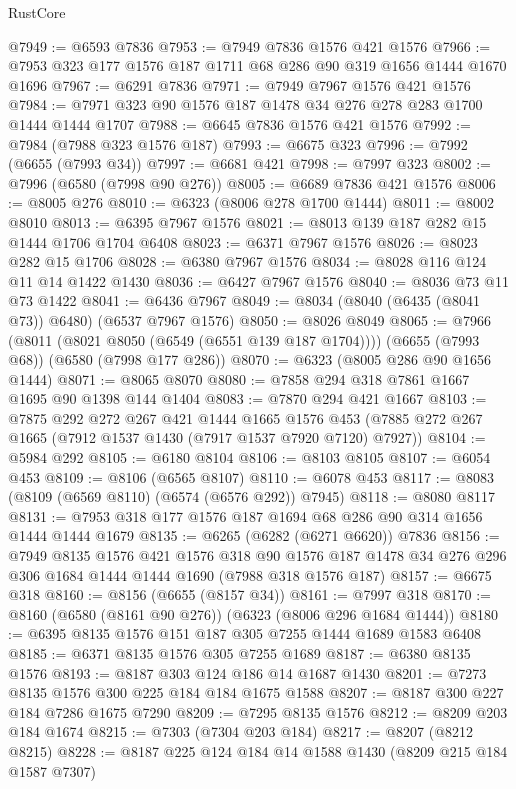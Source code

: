 \begin{lexlean}{RustCore}
\begin{coremodule}
{\begin{coremodule}
{{{{{{{{{{{{{{{{{{{{{{{{{{{{{{{{{{{{{{{{{{{{{@7949 := @6593 @7836
@7953 := @7949 @7836 @1576 @421 @1576
@7966 := @7953 @323 @177 @1576 @187 @1711 @68 @286 @90 @319 @1656 @1444 @1670 @1696
@7967 := @6291 @7836
@7971 := @7949 @7967 @1576 @421 @1576
@7984 := @7971 @323 @90 @1576 @187 @1478 @34 @276 @278 @283 @1700 @1444 @1444 @1707
@7988 := @6645 @7836 @1576 @421 @1576
@7992 := @7984 (@7988 @323 @1576 @187)
@7993 := @6675 @323
@7996 := @7992 (@6655 (@7993 @34))
@7997 := @6681 @421
@7998 := @7997 @323
@8002 := @7996 (@6580 (@7998 @90 @276))
@8005 := @6689 @7836 @421 @1576
@8006 := @8005 @276
@8010 := @6323 (@8006 @278 @1700 @1444)
@8011 := @8002 @8010
@8013 := @6395 @7967 @1576
@8021 := @8013 @139 @187 @282 @15 @1444 @1706 @1704 @6408
@8023 := @6371 @7967 @1576
@8026 := @8023 @282 @15 @1706
@8028 := @6380 @7967 @1576
@8034 := @8028 @116 @124 @11 @14 @1422 @1430
@8036 := @6427 @7967 @1576
@8040 := @8036 @73 @11 @73 @1422
@8041 := @6436 @7967
@8049 := @8034 (@8040 (@6435 (@8041 @73)) @6480) (@6537 @7967 @1576)
@8050 := @8026 @8049
@8065 := @7966
    (@8011 (@8021 @8050 (@6549 (@6551 @139 @187 @1704))))
    (@6655 (@7993 @68))
    (@6580 (@7998 @177 @286))
@8070 := @6323 (@8005 @286 @90 @1656 @1444)
@8071 := @8065 @8070
@8080 := @7858 @294 @318 @7861 @1667 @1695 @90 @1398 @144 @1404
@8083 := @7870 @294 @421 @1667
@8103 := @7875
    @292
    @272
    @267
    @421
    @1444
    @1665
    @1576
    @453
    (@7885 @272 @267 @1665 (@7912 @1537 @1430 (@7917 @1537 @7920 @7120) @7927))
@8104 := @5984 @292
@8105 := @6180 @8104
@8106 := @8103 @8105
@8107 := @6054 @453
@8109 := @8106 (@6565 @8107)
@8110 := @6078 @453
@8117 := @8083 (@8109 (@6569 @8110) (@6574 (@6576 @292)) @7945)
@8118 := @8080 @8117
@8131 := @7953 @318 @177 @1576 @187 @1694 @68 @286 @90 @314 @1656 @1444 @1444 @1679
@8135 := @6265 (@6282 (@6271 @6620)) @7836
@8156 := @7949
    @8135
    @1576
    @421
    @1576
    @318
    @90
    @1576
    @187
    @1478
    @34
    @276
    @296
    @306
    @1684
    @1444
    @1444
    @1690
    (@7988 @318 @1576 @187)
@8157 := @6675 @318
@8160 := @8156 (@6655 (@8157 @34))
@8161 := @7997 @318
@8170 := @8160 (@6580 (@8161 @90 @276)) (@6323 (@8006 @296 @1684 @1444))
@8180 := @6395 @8135 @1576 @151 @187 @305 @7255 @1444 @1689 @1583 @6408
@8185 := @6371 @8135 @1576 @305 @7255 @1689
@8187 := @6380 @8135 @1576
@8193 := @8187 @303 @124 @186 @14 @1687 @1430
@8201 := @7273 @8135 @1576 @300 @225 @184 @184 @1675 @1588
@8207 := @8187 @300 @227 @184 @7286 @1675 @7290
@8209 := @7295 @8135 @1576
@8212 := @8209 @203 @184 @1674
@8215 := @7303 (@7304 @203 @184)
@8217 := @8207 (@8212 @8215)
@8228 := @8187 @225 @124 @184 @14 @1588 @1430 (@8209 @215 @184 @1587 @7307)
}}}}}}}}}}}}}}}}}}}}}}}}}}}}}}}}}}}}}}}}}}}}}
\end{coremodule}}
\end{coremodule}
\end{lexlean}
